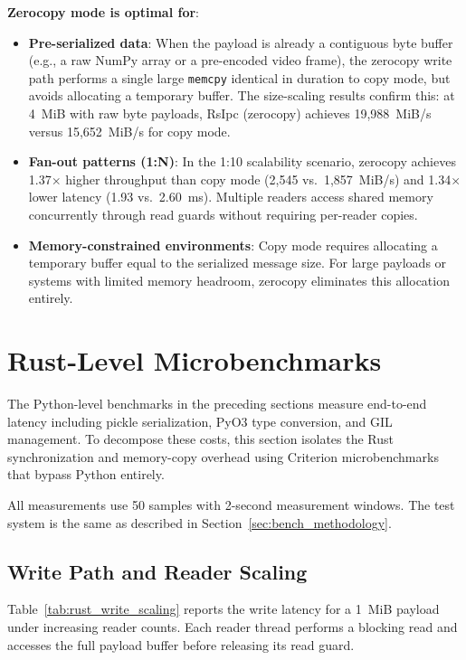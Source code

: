 \textbf{Zerocopy mode is optimal for}:
\begin{itemize}
    \item \textbf{Pre-serialized data}: When the payload is already a contiguous byte buffer (e.g., a raw NumPy array or a pre-encoded video frame), the zerocopy write path performs a single large \texttt{memcpy} identical in duration to copy mode, but avoids allocating a temporary buffer. The size-scaling results confirm this: at 4~MiB with raw byte payloads, RsIpc (zerocopy) achieves 19,988~MiB/s versus 15,652~MiB/s for copy mode.

    \item \textbf{Fan-out patterns (1:N)}: In the 1:10 scalability scenario, zerocopy achieves 1.37$\times$ higher throughput than copy mode (2,545 vs.\ 1,857~MiB/s) and 1.34$\times$ lower latency (1.93 vs.\ 2.60~ms). Multiple readers access shared memory concurrently through read guards without requiring per-reader copies.

    \item \textbf{Memory-constrained environments}: Copy mode requires allocating a temporary buffer equal to the serialized message size. For large payloads or systems with limited memory headroom, zerocopy eliminates this allocation entirely.
\end{itemize}

\section{Rust-Level Microbenchmarks}
\label{sec:rust_microbench}

The Python-level benchmarks in the preceding sections measure end-to-end latency including pickle serialization, PyO3 type conversion, and GIL management. To decompose these costs, this section isolates the Rust synchronization and memory-copy overhead using Criterion microbenchmarks that bypass Python entirely.

All measurements use 50 samples with 2-second measurement windows. The test system is the same as described in Section~\ref{sec:bench_methodology}.

\subsection{Write Path and Reader Scaling}

Table~\ref{tab:rust_write_scaling} reports the write latency for a 1~MiB payload under increasing reader counts. Each reader thread performs a blocking read and accesses the full payload buffer before releasing its read guard.

